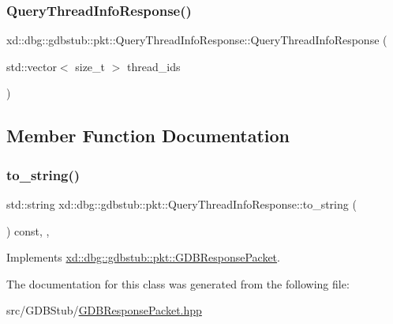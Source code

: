 \subsubsection{\texorpdfstring{Query\+Thread\+Info\+Response()}{QueryThreadInfoResponse()}}
{\footnotesize\ttfamily xd\+::dbg\+::gdbstub\+::pkt\+::\+Query\+Thread\+Info\+Response\+::\+Query\+Thread\+Info\+Response (\begin{DoxyParamCaption}\item[{std\+::vector$<$ size\+\_\+t $>$}]{thread\+\_\+ids }\end{DoxyParamCaption})\hspace{0.3cm}{\ttfamily [inline]}}



\subsection{Member Function Documentation}
\mbox{\label{classxd_1_1dbg_1_1gdbstub_1_1pkt_1_1_query_thread_info_response_a4c96e3015f3317681ec8ee1e63f78639}} 
\subsubsection{\texorpdfstring{to\+\_\+string()}{to\_string()}}
{\footnotesize\ttfamily std\+::string xd\+::dbg\+::gdbstub\+::pkt\+::\+Query\+Thread\+Info\+Response\+::to\+\_\+string (\begin{DoxyParamCaption}{ }\end{DoxyParamCaption}) const\hspace{0.3cm}{\ttfamily [inline]}, {\ttfamily [override]}, {\ttfamily [virtual]}}



Implements \mbox{\hyperlink{classxd_1_1dbg_1_1gdbstub_1_1pkt_1_1_g_d_b_response_packet_a2a15795536cd5ff94f0533c406233874}{xd\+::dbg\+::gdbstub\+::pkt\+::\+G\+D\+B\+Response\+Packet}}.



The documentation for this class was generated from the following file\+:\begin{DoxyCompactItemize}
\item 
src/\+G\+D\+B\+Stub/\mbox{\hyperlink{_g_d_b_response_packet_8hpp}{G\+D\+B\+Response\+Packet.\+hpp}}\end{DoxyCompactItemize}
